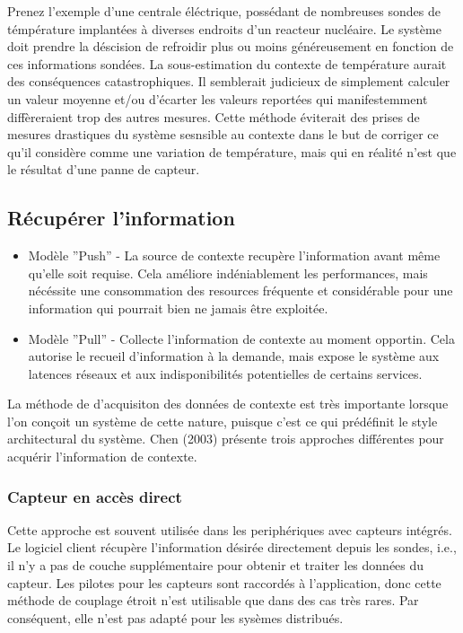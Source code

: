 Prenez l'exemple d'une centrale éléctrique, possédant de nombreuses sondes de
témpérature implantées à diverses endroits d'un reacteur nucléaire. Le système
doit prendre la déscision de refroidir plus ou moins généreusement en fonction
de ces informations sondées. La sous-estimation du contexte de température
aurait des conséquences catastrophiques. Il semblerait judicieux de simplement
calculer un valeur moyenne et/ou d'écarter les valeurs reportées qui
manifestemment diffèreraient trop des autres mesures. Cette méthode éviterait
des prises de mesures drastiques du système sesnsible au contexte dans le but de
corriger ce qu'il considère comme une variation de température, mais qui en
réalité n'est que le résultat d'une panne de capteur.

\subsection{Récupérer l'information}

\begin{itemize}
  \item Modèle ''Push'' - La source de contexte recupère l'information avant
	  même qu'elle soit requise. Cela améliore indéniablement les
	  performances, mais nécéssite une consommation des resources fréquente
	  et considérable pour une information qui pourrait bien ne jamais être
	  exploitée.
  \item Modèle ''Pull'' - Collecte l'information de contexte au moment opportin.
	  Cela autorise le recueil d'information à la demande, mais expose le
	  système aux latences réseaux et aux indisponibilités potentielles de
	  certains services.
\end{itemize}

La méthode de d'acquisiton des données de contexte est très importante lorsque
l'on conçoit un système de cette nature, puisque c'est ce qui prédéfinit le style
architectural du système. Chen (2003) \cite{chen_intelligent_2003} présente
trois approches différentes pour acquérir l'information de contexte.

\subsubsection{Capteur en accès direct}

Cette approche est souvent utilisée dans les periphériques avec capteurs
intégrés. Le logiciel client récupère l'information désirée directement depuis
les sondes, i.e., il n'y a pas de couche supplémentaire pour obtenir et traiter
les données du capteur. Les pilotes pour les capteurs sont raccordés à
l'application, donc cette méthode de couplage étroit n'est utilisable que dans
des cas très rares. Par conséquent, elle n'est pas adapté pour les sysèmes
distribués.

